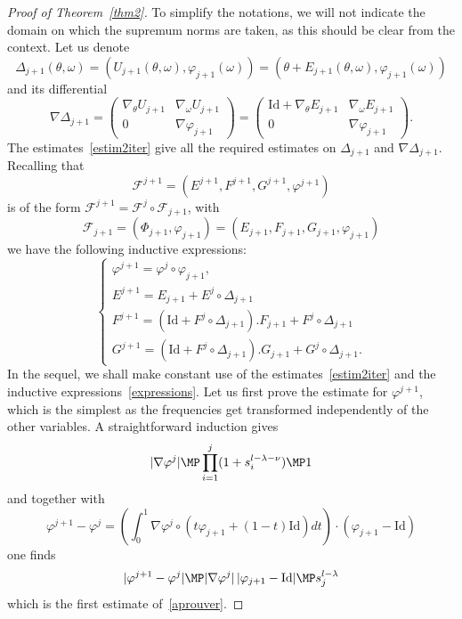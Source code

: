 \begin{proof}[Proof of Theorem~\ref{thm2}]
To simplify the notations, we will not indicate the domain on which the supremum norms are taken, as this should be clear from the context. Let us denote
\[ \Delta_{j+1}(\theta,\omega)=(U_{j+1}(\theta,\omega),\varphi_{j+1}(\omega))=(\theta+E_{j+1}(\theta,\omega),\varphi_{j+1}(\omega)) \]
and its differential
\[ \nabla \Delta_{j+1}=
\begin{pmatrix}
\nabla_\theta U_{j+1} & \nabla_\omega U_{j+1} \\
0 & \nabla \varphi_{j+1}
\end{pmatrix}
=
\begin{pmatrix}
\mathrm{Id}+\nabla_\theta E_{j+1} & \nabla_\omega E_{j+1} \\
0 & \nabla \varphi_{j+1}
\end{pmatrix}.
\]
The estimates~\eqref{estim2iter} give all the required estimates on $\Delta_{j+1}$ and $\nabla \Delta_{j+1}$. Recalling that
\[ \mathcal{F}^{j+1}=(E^{j+1},F^{j+1},G^{j+1},\varphi^{j+1}) \]
is of the form $\mathcal{F}^{j+1}=\mathcal{F}^{j} \circ \mathcal{F}_{j+1}$, with
\[ \mathcal{F}_{j+1}=(\Phi_{j+1},\varphi_{j+1})=(E_{j+1},F_{j+1},G_{j+1},\varphi_{j+1}) \]
we have the following inductive expressions:
\begin{equation}\label{expressions}
\begin{cases}
\varphi^{j+1}=\varphi^j \circ \varphi_{j+1}, \\
E^{j+1}=E_{j+1}+E^j \circ \Delta_{j+1} \\
F^{j+1}=(\mathrm{Id}+F^j \circ \Delta_{j+1}).F_{j+1}+F^j\circ \Delta_{j+1} \\
G^{j+1}=(\mathrm{Id}+F^j \circ \Delta_{j+1}).G_{j+1}+G^j\circ \Delta_{j+1}.
\end{cases}
\end{equation}
In the sequel, we shall make constant use of the estimates~\eqref{estim2iter} and the inductive expressions~\eqref{expressions}. Let us first prove the estimate for $\varphi^{j+1}$, which is the simplest as the frequencies get transformed independently of the other variables. A straightforward induction gives
\[ |\nabla \varphi^{j}| \MP \prod_{i=1}^{j}(1+s_i^{l-\lambda-\nu}) \MP 1 \]
and together with
\[ \varphi^{j+1}-\varphi^{j}=\left(\int_0^1\nabla \varphi^j \circ (t \varphi_{j+1}+(1-t)\mathrm{Id})dt\right)\cdot (\varphi_{j+1}-\mathrm{Id}) \]
one finds
\[ |\varphi^{j+1}-\varphi^{j}| \MP |\nabla \varphi^j|\, |\varphi_{j+1}-\mathrm{Id}|\MP s_j^{l-\lambda} \]
which is the first estimate of~\eqref{aprouver}.


\end{proof}
